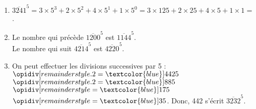 \ \\ [-5mm]
\begin{enumerate}
      \item $\overline{3241}^5 =3\times5^3+2\times5^2+4\times5^1+1\times5^0 =3\times125+2\times25+4\times5+1\times1 = $ {}.
      \item Le nombre qui précède $\overline{1200}^5$ est {\blue $\overline{1144}^5$}. \\
         Le nombre qui suit $\overline{4214}^5$ est {\blue $\overline{4220}^5$}.
      \item On peut effectuer les divisions successives par 5 : \\ [1mm]
      $\opidiv[remainderstyle.2=\textcolor{blue}]{442}{5}$ \quad $\opidiv[remainderstyle.2=\textcolor{blue}]{88}{5}$ \quad $\opidiv[remainderstyle=\textcolor{blue}]{17}{5}$ \quad $\opidiv[remainderstyle=\textcolor{blue}]{3}{5}$. \qquad Donc, 442 s'écrit {\blue $\overline{3232}^5$}.
   \end{enumerate}
